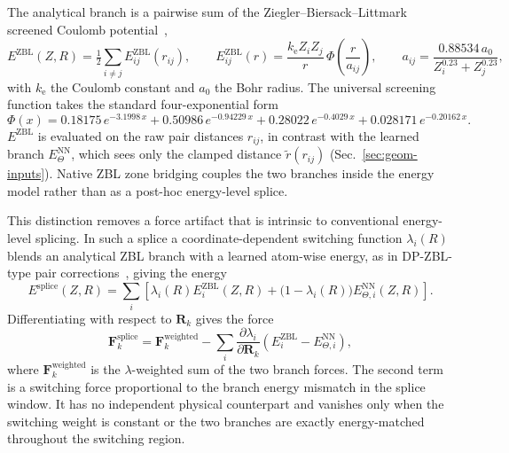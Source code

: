 The analytical branch is a pairwise sum of the Ziegler--Biersack--Littmark screened Coulomb potential~\cite{ziegler1985},
\begin{equation}
    E^{\mathrm{ZBL}}(Z,R) = \tfrac{1}{2}\sum_{i\neq j}E_{ij}^{\mathrm{ZBL}}(r_{ij}),
    \qquad
    E_{ij}^{\mathrm{ZBL}}(r)= \frac{k_{\mathrm{e}}Z_iZ_j}{r}\,\Phi\!\left(\frac{r}{a_{ij}}\right),
    \qquad
    a_{ij}=\frac{0.88534\,a_0}{Z_i^{0.23}+Z_j^{0.23}},
    \label{eq:dpa4-zbl}
\end{equation}
with $k_{\mathrm{e}}$ the Coulomb constant and $a_0$ the Bohr radius.
The universal screening function takes the standard four-exponential form
\begin{equation}
    \Phi(x)=0.18175\,e^{-3.1998\,x}
    +0.50986\,e^{-0.94229\,x}
    +0.28022\,e^{-0.4029\,x}
    +0.028171\,e^{-0.20162\,x}.
    \label{eq:dpa4-zbl-phi}
\end{equation}
$E^{\mathrm{ZBL}}$ is evaluated on the raw pair distances $r_{ij}$, in contrast with the learned branch $E_{\Theta}^{\mathrm{NN}}$, which sees only the clamped distance $\widetilde{r}(r_{ij})$ (Sec.~\ref{sec:geom-inputs}).
Native ZBL zone bridging couples the two branches inside the energy model rather than as a post-hoc energy-level splice.

This distinction removes a force artifact that is intrinsic to conventional energy-level splicing.
In such a splice a coordinate-dependent switching function $\lambda_i(R)$ blends an analytical ZBL branch with a learned atom-wise energy, as in DP-ZBL-type pair corrections~\cite{wang2019dpzbl}, giving the energy
\begin{equation}
    E^{\mathrm{splice}}(Z,R) = \sum_i \left[ \lambda_i(R)E_i^{\mathrm{ZBL}}(Z,R) +\bigl(1-\lambda_i(R)\bigr)E_{\Theta,i}^{\mathrm{NN}}(Z,R) \right].
    \label{eq:zbl-splice-energy}
\end{equation}
Differentiating with respect to $\mathbf{R}_k$ gives the force
\begin{equation}
    \mathbf{F}_k^{\mathrm{splice}}
    =
    \mathbf{F}_{k}^{\mathrm{weighted}}
    -
    \sum_i
    \frac{\partial \lambda_i}{\partial \mathbf{R}_k}
    \left(
    E_i^{\mathrm{ZBL}}-E_{\Theta,i}^{\mathrm{NN}}
    \right),
    \label{eq:zbl-switching-force}
\end{equation}
where $\mathbf{F}_{k}^{\mathrm{weighted}}$ is the $\lambda$-weighted sum of the two branch forces.
The second term is a switching force proportional to the branch energy mismatch in the splice window.
It has no independent physical counterpart and vanishes only when the switching weight is constant or the two branches are exactly energy-matched throughout the switching region.

